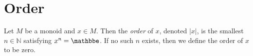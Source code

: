 \section{Order}

\begin{definition}
    \label{definition : order}
    \leanok
    Let $M$ be a monoid and $x \in M$. Then the \textit{order} of $x$, denoted $|x|$, is the smallest $n \in \mathbb{N}$ satisfying $x^n = \mathbbe$. If no such $n$ exists, then we define the order of $x$ to be zero.
\end{definition}
